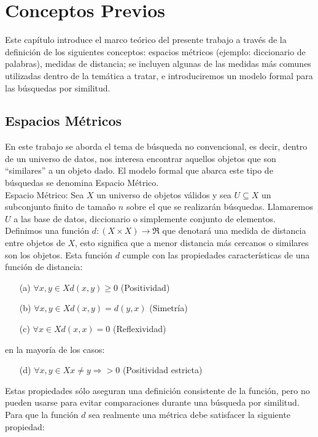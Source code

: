 \chapter{Conceptos Previos}

Este cap\'itulo introduce el marco te\'orico del presente trabajo a trav\'es de la definici\'on de los siguientes conceptos: espacios m\'etricos (ejemplo: diccionario de palabras), medidas de distancia; se incluyen algunas de las medidas m\'as comunes utilizadas dentro de la tem\'atica a tratar, e introduciremos un modelo formal para las b\'usquedas por similitud.\\

\section{Espacios M\'etricos}

En este trabajo se aborda el tema de b\'usqueda no convencional, es decir, dentro de un universo de datos, nos interesa encontrar aquellos objetos que son ``similares'' a un objeto dado. El modelo formal que abarca este tipo de b\'usquedas se denomina Espacio M\'etrico.\\

Espacio M\'etrico:
Sea $X$ un universo de objetos v\'alidos y sea $U \subseteq X$ un subconjunto finito de tama\~no $n$ sobre el que se realizar\'an b\'usquedas. Llamaremos $U$ a las base de datos, diccionario o simplemente conjunto de elementos. Definimos una funci\'on $d:(X \times X) \rightarrow \Re$ que denotar\'a una medida de distancia entre objetos de $X$, esto significa que a menor distancia m\'as cercanos o similares son los objetos. Esta funci\'on $d$ cumple con las propiedades caracter\'isticas de una funci\'on de distancia:

\begin{enumerate}
\item [(a)] $\forall x,y \in X d(x,y) \geq 0$ (Positividad)
\item [(b)] $\forall x,y \in X d(x,y) = d(y,x)$ (Simetr\'ia)
\item [(c)] $\forall x \in X d(x,x) = 0 $ (Reflexividad)
\end{enumerate}
en la mayor\'ia de los casos:
\begin{enumerate}
\item [(d)]  $\forall x,y \in X x \neq y \Rightarrow > 0$ (Positividad estricta)
\end{enumerate}

Estas propiedades s\'olo aseguran una definici\'on consistente de la funci\'on, pero no pueden usarse para evitar comparaciones durante una b\'usqueda por similitud. Para que la funci\'on $d$ sea realmente una m\'etrica debe satisfacer la siguiente propiedad:

